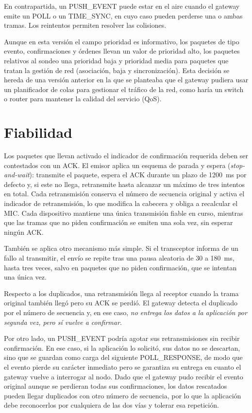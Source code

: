 En contrapartida, un PUSH\_EVENT puede estar en el aire cuando el gateway emite un POLL o un TIME\_SYNC, en cuyo caso pueden perderse una o ambas tramas. Los reintentos permiten resolver las colisiones.

Aunque en esta versión el campo prioridad es informativo, los paquetes de tipo evento, confirmaciones y órdenes llevan un valor de prioridad alto, los paquetes relativos al sondeo una prioridad baja y prioridad media para paquetes que tratan la gestión de red (asociación, baja y sincronización). Esta decisión se hereda de una versión anterior en la que se planteaba que el gateway pudiera usar un planificador de colas para gestionar el tráfico de la red, como haría un switch o router para mantener la calidad del servicio (QoS).


\section{Fiabilidad}\label{sec:fiabilidad}

Los paquetes que llevan activado el indicador de confirmación requerida deben ser contestados con un ACK. El emisor aplica un esquema de parada y espera (\textit{stop-and-wait}): transmite el paquete, espera el ACK durante un plazo de 1200~ms por defecto y, si este no llega, retransmite hasta alcanzar un máximo de tres intentos en total. Cada retransmisión conserva el número de secuencia original y activa el indicador de retransmisión, lo que modifica la cabecera y obliga a recalcular el MIC. Cada dispositivo mantiene una única transmisión fiable en curso, mientras que las tramas que no piden confirmación se emiten una sola vez, sin esperar ningún ACK.

También se aplica otro mecanismo más simple. Si el transceptor informa de un fallo al transmitir, el envío se repite tras una pausa aleatoria de 30 a 180~ms, hasta tres veces, salvo en paquetes que no piden confirmación, que se intentan una única vez.

Respecto a los duplicados, una retransmisión llega al receptor cuando la trama original también llegó pero su ACK se perdió. El gateway detecta el duplicado por el número de secuencia y, en ese caso, \emph{no entrega los datos a la aplicación por segunda vez, pero sí vuelve a confirmar}.

Por otro lado, un PUSH\_EVENT podría agotar sus retransmisiones sin recibir confirmación. En ese caso, si la aplicación lo solicitó, sus datos no se descartan, sino que se guardan como carga del siguiente POLL\_RESPONSE, de modo que el evento pierde su carácter inmediato pero se garantiza su entrega en cuanto el gateway vuelve a interrogar al nodo. Dado que el gateway pudo recibir el evento original aunque se perdieran todas sus confirmaciones, los datos rescatados pueden llegar duplicados con otro número de secuencia, por lo que la aplicación debe reconocerlos por cualquiera de las dos vías y tolerar esa repetición.

